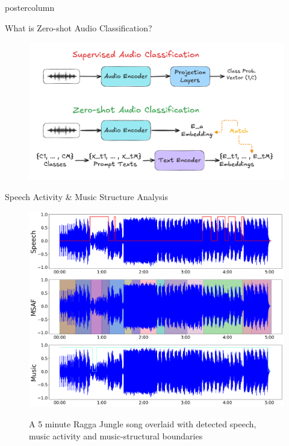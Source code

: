 \documentclass{beamer}
\newlength{\columnheight}
\begin{document}
\begin{frame}
\begin{columns}
	
	
	\begin{column}{.57\textwidth}
		\begin{beamercolorbox}[center]{postercolumn}
			\begin{minipage}{.98\textwidth} %
				\parbox[t][\columnheight]{\textwidth}{ %
					\begin{myblock}{What is Zero-shot Audio Classification?}
						\begin{figure}
							\begin{minipage}{.94\textwidth}
								\centering\includegraphics[width=\textwidth]{img/CLAP-ISMIR_lbd.pdf}
								\caption{}
							\end{minipage}
						\end{figure}
					\end{myblock}\vfill
					
					
				\begin{myblock}{Speech Activity \& Music Structure Analysis}
			\vspace{1em}
			\begin{figure}
			 \centerline{
			 	\includegraphics[alt={SMAD \& MSAF Analysis signals}, width=0.6\columnwidth]{img/smad_msaf.png}
			 	}
			 \caption{A 5 minute Ragga Jungle song overlaid with detected speech, \\ music activity and music-structural boundaries}
			 \label{fig:msafsmadplot}
			\end{figure}
	

\end{myblock}}
\end{minipage}
\end{beamercolorbox}
\end{column}
\end{columns}
\end{frame}
\end{document}
